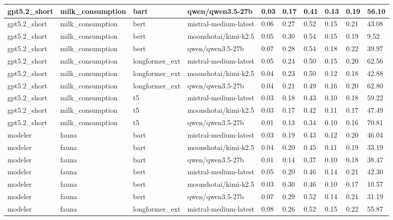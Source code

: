 \begin{tabular}{|l|l|l|l|l|l|l|l|l|l|}
 \hline
 gpt5.2\_short & milk\_consumption & bart & qwen/qwen3.5-27b & 0.03 & 0.17 & 0.41 & 0.13 & 0.19 & 56.10 \\
 \hline
 gpt5.2\_short & milk\_consumption & bert & mistral-medium-latest & 0.06 & 0.27 & 0.52 & 0.15 & 0.21 & 43.08 \\
 \hline
 gpt5.2\_short & milk\_consumption & bert & moonshotai/kimi-k2.5 & 0.05 & 0.30 & 0.54 & 0.15 & 0.19 & 9.52 \\
 \hline
 gpt5.2\_short & milk\_consumption & bert & qwen/qwen3.5-27b & 0.07 & 0.28 & 0.54 & 0.18 & 0.22 & 39.97 \\
 \hline
 gpt5.2\_short & milk\_consumption & longformer\_ext & mistral-medium-latest & 0.05 & 0.24 & 0.50 & 0.15 & 0.20 & 62.56 \\
 \hline
 gpt5.2\_short & milk\_consumption & longformer\_ext & moonshotai/kimi-k2.5 & 0.04 & 0.23 & 0.50 & 0.12 & 0.18 & 42.88 \\
 \hline
 gpt5.2\_short & milk\_consumption & longformer\_ext & qwen/qwen3.5-27b & 0.04 & 0.21 & 0.49 & 0.16 & 0.20 & 62.80 \\
 \hline
 gpt5.2\_short & milk\_consumption & t5 & mistral-medium-latest & 0.03 & 0.18 & 0.43 & 0.10 & 0.18 & 59.22 \\
 \hline
 gpt5.2\_short & milk\_consumption & t5 & moonshotai/kimi-k2.5 & 0.03 & 0.17 & 0.42 & 0.11 & 0.17 & 47.49 \\
 \hline
 gpt5.2\_short & milk\_consumption & t5 & qwen/qwen3.5-27b & 0.01 & 0.13 & 0.34 & 0.10 & 0.16 & 70.81 \\
 \hline
 modeler & fauna & bart & mistral-medium-latest & 0.03 & 0.19 & 0.43 & 0.12 & 0.20 & 46.04 \\
 \hline
 modeler & fauna & bart & moonshotai/kimi-k2.5 & 0.04 & 0.20 & 0.45 & 0.11 & 0.19 & 33.19 \\
 \hline
 modeler & fauna & bart & qwen/qwen3.5-27b & 0.01 & 0.14 & 0.37 & 0.10 & 0.18 & 38.47 \\
 \hline
 modeler & fauna & bert & mistral-medium-latest & 0.05 & 0.20 & 0.46 & 0.14 & 0.21 & 42.30 \\
 \hline
 modeler & fauna & bert & moonshotai/kimi-k2.5 & 0.03 & 0.30 & 0.46 & 0.10 & 0.17 & 10.57 \\
 \hline
 modeler & fauna & bert & qwen/qwen3.5-27b & 0.07 & 0.29 & 0.52 & 0.14 & 0.21 & 31.19 \\
 \hline
 modeler & fauna & longformer\_ext & mistral-medium-latest & 0.08 & 0.26 & 0.52 & 0.15 & 0.22 & 55.87 \\
 \hline

\end{tabular}
